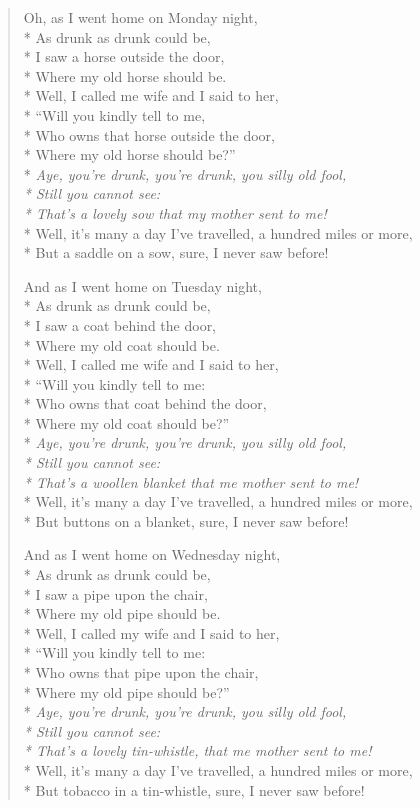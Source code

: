 \documentclass[9pt,twoside]{extarticle}
\newenvironment{xverse}{
	\begin{verse}
	\fontsize{8.5}{10.5}\selectfont
	}
	{
	\end{verse}
	\penalty 0
}
\begin{document}
\begin{xverse}
Oh, as I went home on Monday night, \\*
As drunk as drunk could be, \\*
I saw a horse outside the door, \\*
Where my old horse should be. \\*
Well, I called me wife and I said to her, \\*
“Will you kindly tell to me, \\*
Who owns that horse outside the door, \\*
Where my old horse should be?” \\*
\textit{Aye, you’re drunk, you’re drunk, you silly old fool, \\*
Still you cannot see: \\*
That’s a lovely sow that my mother sent to me!} \\*
Well, it’s many a day I’ve travelled, a hundred miles or more, \\*
But a saddle on a sow, sure, I never saw before!

And as I went home on Tuesday night, \\*
As drunk as drunk could be, \\*
I saw a coat behind the door, \\*
Where my old coat should be. \\*
Well, I called me wife and I said to her, \\*
“Will you kindly tell to me: \\*
Who owns that coat behind the door, \\*
Where my old coat should be?” \\*
\textit{Aye, you’re drunk, you’re drunk, you silly old fool, \\*
Still you cannot see: \\*
That’s a woollen blanket that me mother sent to me!} \\*
Well, it’s many a day I’ve travelled, a hundred miles or more, \\*
But buttons on a blanket, sure, I never saw before!

And as I went home on Wednesday night, \\*
As drunk as drunk could be, \\*
I saw a pipe upon the chair, \\*
Where my old pipe should be. \\*
Well, I called my wife and I said to her, \\*
“Will you kindly tell to me: \\*
Who owns that pipe upon the chair, \\*
Where my old pipe should be?” \\*
\textit{Aye, you’re drunk, you’re drunk, you silly old fool, \\*
Still you cannot see: \\*
That’s a lovely tin-whistle, that me mother sent to me!} \\*
Well, it’s many a day I’ve travelled, a hundred miles or more, \\*
But tobacco in a tin-whistle, sure, I never saw before!


\end{xverse}
\end{document}
